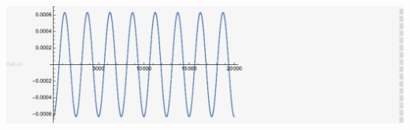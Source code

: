 \documentclass[12pt]{article}
\begin{document}
\begin{enumerate}
\begin{enumerate}
            \includegraphics{HW_6_screenshots/q_5_gr6}

        \end{enumerate}
    \end{enumerate}
\end{document}
